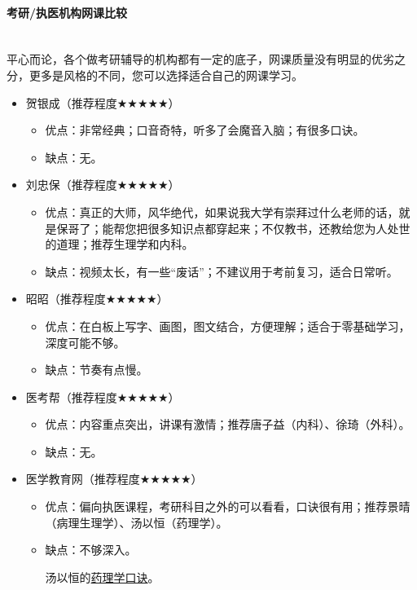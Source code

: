 \documentclass[zihao=-4,fontset=none]{Beautybook-CN}
\begin{document}
\paragraph{\textbf{考研/执医机构网课比较}}\mbox{}\\
平心而论，各个做考研辅导的机构都有一定的底子，网课质量没有明显的优劣之分，更多是风格的不同，您可以选择适合自己的网课学习。
\begin{itemize}
	\item 贺银成（推荐程度${\bigstar}$${\bigstar}$${\bigstar}$${\bigstar}$${\bigstar}$）
	      \begin{itemize}
	      	\item 优点：非常经典；口音奇特，听多了会魔音入脑；有很多口诀。
	      	\item 缺点：无。
	      \end{itemize}
	      	      
	\item 刘忠保（推荐程度${\bigstar}$${\bigstar}$${\bigstar}$${\bigstar}$${\bigstar}$）
	      \begin{itemize}
	      	\item 优点：真正的大师，风华绝代，如果说我大学有崇拜过什么老师的话，就是保哥了；能帮您把很多知识点都穿起来；不仅教书，还教给您为人处世的道理；推荐生理学和内科。
	      	\item 缺点：视频太长，有一些“废话”；不建议用于考前复习，适合日常听。
	      \end{itemize}
	      	      
	\item 昭昭（推荐程度${\bigstar}$${\bigstar}$${\bigstar}$${\bigstar}$${\bigstar}$）
	      \begin{itemize}
	      	\item 优点：在白板上写字、画图，图文结合，方便理解；适合于零基础学习，深度可能不够。
	      	\item 缺点：节奏有点慢。
	      \end{itemize}
	      	      
	\item 医考帮（推荐程度${\bigstar}$${\bigstar}$${\bigstar}$${\bigstar}$${\bigstar}$）
	      \begin{itemize}
	      	\item 优点：内容重点突出，讲课有激情；推荐唐子益（内科）、徐琦（外科）。
	      	\item 缺点：无。
	      \end{itemize}
	      	      
	\item 医学教育网（推荐程度${\bigstar}$${\bigstar}$${\bigstar}$${\bigstar}$${\bigstar}$）
	      \begin{itemize}
	      	\item 优点：偏向执医课程，考研科目之外的可以看看，口诀很有用；推荐景晴（病理生理学）、汤以恒（药理学）。
	      	\item 缺点：不够深入。
	      	      \begin{example}
	      	      	汤以恒的\href{https://docs.qq.com/doc/DZXRuZXVGZktRSFhM}{药理学口诀}。
	      	      \end{example}
	      \end{itemize}
	      	      

\end{itemize}
\end{document}
